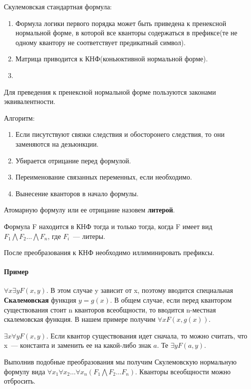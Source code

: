 Скулемовская стандартная формула:
\begin{enumerate}
	\item Формула логики первого порядка может быть приведена к пренексной нормальной форме, в которой все кванторы содержаться в префиксе(те не одному квантору не соответствует предикатный символ).
	\item Матрица приводится к КНФ(коньюктивной нормальной форме).
	\item
\end{enumerate}

Для преведения к пренексной нормальной форме пользуются законами эквивалентности.

Алгоритм:
\begin{enumerate}
	\item Если писутствуют связки следствия и обосторонего следствия, то они заменяются на дезьюнкции.
	\item Убирается отрицание перед формулой.
	\item Переименование связанных переменных, если необходимо.
	\item Вынесение кванторов в начало формулы.
\end{enumerate}

Атомарную формулу или ее отрицание назовем \textbf{литерой}.

Формула F находится в КНФ тогда и только тогда, когда F имеет вид $F_1\bigwedge{}F_2\ldots\bigwedge{}F_n$, где $F_i$~--- литеры.

После преобразования к КНФ необходимо иллиминировать префиксы.

\paragraph{Пример}
$\forall{}x\exists{}yF(x,y)$. В этом случае y зависит от x, поэтому вводится специальная \textbf{Скалемовская} функция $y=g(x)$. В общем случае, если перед квантором существования стоит n кванторов всеобщности, то вводится n-местная скалемовская функция. В нашем примере получим $\forall{}xF(x,g(x))$.

$\exists{}x\forall{}yF(x,y)$. Если квантор существования идет сначала, то можно считать, что x~--- константа и заменить ее на какой-либо знак $a$. Те $\exists{}yF(a,y)$.

Выполнив подобные преобразования мы получим Скулемовскую нормальную формулу вида $\forall{}x_1\forall{}x_2\ldots\forall{}x_n(F_1\bigwedge{}F_2\ldots{}F_n)$. Кванторы всеобщности можно отбросить.

